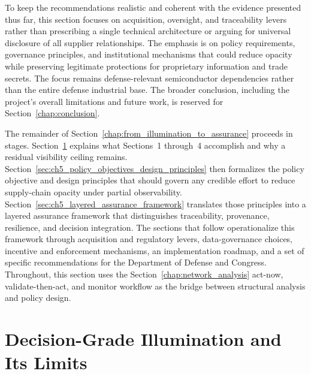 To keep the recommendations realistic and coherent with the evidence presented thus far, this section focuses on acquisition, oversight, and traceability levers rather than prescribing a single technical architecture or arguing for universal disclosure of all supplier relationships. The emphasis is on policy requirements, governance principles, and institutional mechanisms that could reduce opacity while preserving legitimate protections for proprietary information and trade secrets. The focus remains defense-relevant semiconductor dependencies rather than the entire defense industrial base. The broader conclusion, including the project's overall limitations and future work, is reserved for Section~\ref{chap:conclusion}.

The remainder of Section~\ref{chap:from_illumination_to_assurance} proceeds in stages. Section~\ref{sec:ch5_decision_grade_illumination_limits} explains what Sections~1 through~4 accomplish and why a residual visibility ceiling remains. Section~\ref{sec:ch5_policy_objectives_design_principles} then formalizes the policy objective and design principles that should govern any credible effort to reduce supply-chain opacity under partial observability. Section~\ref{sec:ch5_layered_assurance_framework} translates those principles into a layered assurance framework that distinguishes traceability, provenance, resilience, and decision integration. The sections that follow operationalize this framework through acquisition and regulatory levers, data-governance choices, incentive and enforcement mechanisms, an implementation roadmap, and a set of specific recommendations for the Department of Defense and Congress. Throughout, this section uses the Section~\ref{chap:network_analysis} act-now, validate-then-act, and monitor workflow as the bridge between structural analysis and policy design.

\section{Decision-Grade Illumination and Its Limits}
\label{sec:ch5_decision_grade_illumination_limits}

